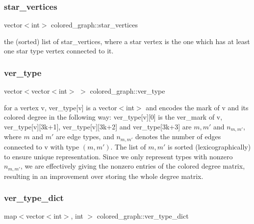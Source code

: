 \subsubsection{\texorpdfstring{star\+\_\+vertices}{star\_vertices}}
{\footnotesize\ttfamily vector$<$int$>$ colored\+\_\+graph\+::star\+\_\+vertices}



the (sorted) list of star\+\_\+vertices, where a star vertex is the one which has at least one star type vertex connected to it. 

\mbox{\label{classcolored__graph_a2cc32e7146fa3319f83cfa940f5e1be4}} 
\subsubsection{\texorpdfstring{ver\+\_\+type}{ver\_type}}
{\footnotesize\ttfamily vector$<$vector$<$int$>$ $>$ colored\+\_\+graph\+::ver\+\_\+type}



for a vertex v, ver\+\_\+type\mbox{[}v\mbox{]} is a vector$<$int$>$ and encodes the mark of v and its colored degree in the following way\+: ver\+\_\+type\mbox{[}v\mbox{]}\mbox{[}0\mbox{]} is the ver\+\_\+mark of v, ver\+\_\+type\mbox{[}v\mbox{]}\mbox{[}3k+1\mbox{]}, ver\+\_\+type\mbox{[}v\mbox{]}\mbox{[}3k+2\mbox{]} and ver\+\_\+type\mbox{[}3k+3\mbox{]} are $m, m'$ and $n_{m, m'}$, where $m$ and $m'$ are edge types, and $n_{m, m'}$ denotes the number of edges connected to v with type $(m, m')$. The list of $m, m'$ is sorted (lexicographically) to ensure unique representation. Since we only represent types with nonzero $n_{m, m'}$, we are effectively giving the nonzero entries of the colored degree matrix, resulting in an improvement over storing the whole degree matrix. 

\mbox{\label{classcolored__graph_aeb780762429ddac375799f4a45405712}} 
\subsubsection{\texorpdfstring{ver\+\_\+type\+\_\+dict}{ver\_type\_dict}}
{\footnotesize\ttfamily map$<$vector$<$int$>$, int $>$ colored\+\_\+graph\+::ver\+\_\+type\+\_\+dict}




